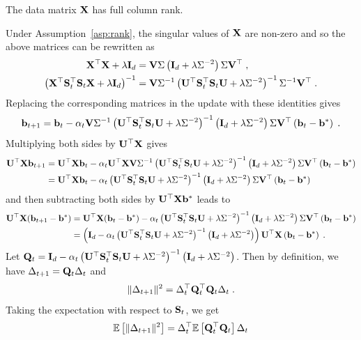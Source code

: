 \begin{assumption} \label{asp:rank}
The data matrix $\mathbf{X}$ has full column rank.
\end{assumption}

Under Assumption~\ref{asp:rank}, the singular values of $\mathbf{X}$ are non-zero and so the above matrices can be rewritten as
\begin{align*}
\mathbf{X}^\top\mathbf{X}+\lambda\mathbf{I}_d &= \mathbf{V}\Sigma\left(\mathbf{I}_d + \lambda\Sigma^{-2}\right)\Sigma\mathbf{V}^\top \;, \\
\left(\mathbf{X}^\top\mathbf{S}_t^\top\mathbf{S}_t\mathbf{X} + \lambda\mathbf{I}_d\right)^{-1} &= \mathbf{V}\Sigma^{-1}\left(\mathbf{U}^\top\mathbf{S}_t^\top\mathbf{S}_t\mathbf{U} + \lambda\Sigma^{-2}\right)^{-1}\Sigma^{-1}\mathbf{V}^\top \;.
\end{align*}
Replacing the corresponding matrices in the update with these identities gives
\[
\mathbf{b}_{t+1} = \mathbf{b}_t - \alpha_t\mathbf{V}\Sigma^{-1}\left(\mathbf{U}^\top\mathbf{S}_t^\top\mathbf{S}_t\mathbf{U} + \lambda\Sigma^{-2}\right)^{-1}\left(\mathbf{I}_d + \lambda\Sigma^{-2} \right)\Sigma\mathbf{V}^\top\left(\mathbf{b}_t-\mathbf{b}^*\right) \;.
\]
Multiplying both sides by $\mathbf{U}^\top\mathbf{X}$ gives
\begin{align*}
\mathbf{U}^\top\mathbf{X}\mathbf{b}_{t+1} &= \mathbf{U}^\top\mathbf{X}\mathbf{b}_t - \alpha_t\mathbf{U}^\top\mathbf{X}\mathbf{V}\Sigma^{-1}\left(\mathbf{U}^\top\mathbf{S}_t^\top\mathbf{S}_t\mathbf{U} + \lambda\Sigma^{-2}\right)^{-1}\left(\mathbf{I}_d + \lambda\Sigma^{-2} \right)\Sigma\mathbf{V}^\top\left(\mathbf{b}_t-\mathbf{b}^*\right) \\
&= \mathbf{U}^\top\mathbf{X}\mathbf{b}_t - \alpha_t\left(\mathbf{U}^\top\mathbf{S}_t^\top\mathbf{S}_t\mathbf{U} + \lambda\Sigma^{-2}\right)^{-1}\left(\mathbf{I}_d + \lambda\Sigma^{-2} \right)\Sigma\mathbf{V}^\top\left(\mathbf{b}_t-\mathbf{b}^*\right)
\end{align*}
and then subtracting both sides by $\mathbf{U}^\top\mathbf{X}\mathbf{b}^*$ leads to
\begin{align*}
\mathbf{U}^\top\mathbf{X}(\mathbf{b}_{t+1}-\mathbf{b}^*) &= \mathbf{U}^\top\mathbf{X}(\mathbf{b}_t-\mathbf{b}^*) - \alpha_t\left(\mathbf{U}^\top\mathbf{S}_t^\top\mathbf{S}_t\mathbf{U} + \lambda\Sigma^{-2}\right)^{-1}\left(\mathbf{I}_d + \lambda\Sigma^{-2} \right)\Sigma\mathbf{V}^\top\left(\mathbf{b}_t-\mathbf{b}^*\right) \\
&= \left(\mathbf{I}_d - \alpha_t\left(\mathbf{U}^\top\mathbf{S}_t^\top\mathbf{S}_t\mathbf{U} + \lambda\Sigma^{-2}\right)^{-1}\left(\mathbf{I}_d + \lambda\Sigma^{-2}\right)\right)\mathbf{U}^\top\mathbf{X}\left(\mathbf{b}_t-\mathbf{b}^*\right) \;.
\end{align*}
Let $\mathbf{Q}_t=\mathbf{I}_d - \alpha_t\left(\mathbf{U}^\top\mathbf{S}_t^\top\mathbf{S}_t\mathbf{U} + \lambda\Sigma^{-2}\right)^{-1}\left(\mathbf{I}_d + \lambda\Sigma^{-2}\right)$. Then by definition, we have $\Delta_{t+1} = \mathbf{Q}_t\Delta_t$ and
\[
\|\Delta_{t+1}\|^2 = \Delta_t^\top\mathbf{Q}_t^\top\mathbf{Q}_t\Delta_t \;.
\]
Taking the expectation with respect to $\mathbf{S}_t$, we get
\[
\mathbb{E}\left[\|\Delta_{t+1}\|^2\right] = \Delta_t^\top\mathbb{E}\left[\mathbf{Q}_t^\top\mathbf{Q}_t\right]\Delta_t
\]
